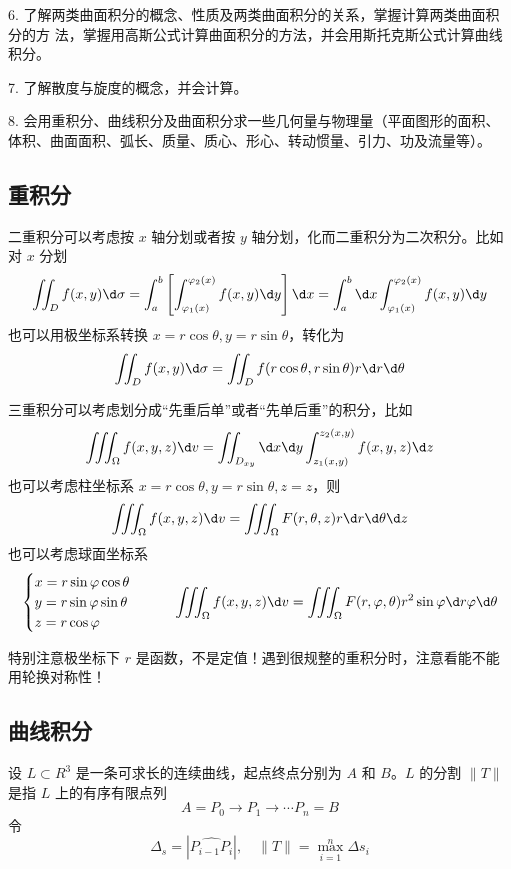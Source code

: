 6. 了解两类曲面积分的概念、性质及两类曲面积分的关系，掌握计算两类曲面积分的方
法，掌握用高斯公式计算曲面积分的方法，并会用斯托克斯公式计算曲线积分。

7. 了解散度与旋度的概念，并会计算。

8. 会用重积分、曲线积分及曲面积分求一些几何量与物理量（平面图形的面积、体积、曲面面积、弧长、质量、质心、形心、转动惯量、引力、功及流量等）。

\subsection{重积分}

二重积分可以考虑按 $x$ 轴分划或者按 $y$ 轴分划，化而二重积分为二次积分。比如对 $x$ 分划
\[ \iint_D f(x, y) \d \sigma = \int_{a}^{b} \left[ \int_{\varphi_1(x)}^{\varphi_2(x)} f(x, y) \d y \right] \d x = \int_{a}^{b} \d x \int_{\varphi_1(x)}^{\varphi_2(x)} f(x, y) \d y \]
也可以用极坐标系转换 $x = r \cos \theta, y = r \sin \theta$，转化为
\[ \iint_{D} f(x, y) \d \sigma = \iint_{D} f(r \cos \theta, r \sin \theta) r \d r \d \theta  \]

三重积分可以考虑划分成“先重后单”或者“先单后重”的积分，比如
\[ \iiint_{\Omega} f(x, y, z) \d v = \iint_{D_{xy}} \d x \d y \int_{z_1(x, y)}^{z_2(x, y)} f(x, y, z) \d z \]
也可以考虑柱坐标系 $x = r \cos \theta, y = r\sin\theta, z = z$，则
\[ \iiint_{\Omega} f(x, y, z) \d v = \iiint_{\Omega} F(r, \theta, z) r \d r \d \theta \d z \]
也可以考虑球面坐标系
\[ \begin{cases}
		x = r \sin \varphi \cos \theta \\
		y = r \sin \varphi \sin \theta \\
		z = r \cos \varphi
	\end{cases} \qquad \iiint_{\Omega} f(x, y, z) \d v = \iiint_{\Omega} F(r, \varphi, \theta) r^2 \sin \varphi \d r \varphi \d \theta \]


\begin{note}
	特别注意极坐标下 $r$ 是函数，不是定值！遇到很规整的重积分时，注意看能不能用轮换对称性！
\end{note}

\subsection{曲线积分}

设 $L \subset R^3$ 是一条可求长的连续曲线，起点终点分别为 $A$ 和 $B$。$L$ 的分割 $\|T\|$ 是指 $L$ 上的有序有限点列
\[ A = P_0 \to P_1 \to \cdots P_n = B \]
令
\[ \Delta_s = \left| \widehat{P_{i-1}P_i} \right|, \quad \|T\| = \max_{i=1}^n \Delta s_i \]

